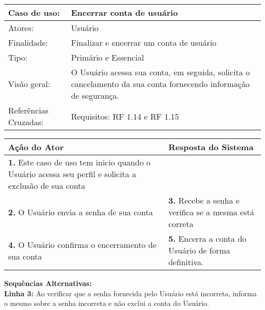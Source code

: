 \documentclass[12pt,a4paper,onecolumn,titlepage]{article}
\begin{document}
\begin{table}[h!]
\begin{center}
\begin{tabular}{p{2.5cm} p{9.5cm}}
Caso de uso: & \textbf{Encerrar conta de usuário} \\ \hline
Atores: & Usuário \\ \hline
Finalidade: & Finalizar e encerrar um conta de usuário\\ \hline
Tipo: & Primário e Essencial \\ \hline
Visão geral: & O Usuário acessa sua conta, em seguida, solicita o cancelamento da sua conta fornecendo informação de segurança. \\ \hline
Referências Cruzadas: & Requisitos: RF 1.14 e RF 1.15\\

\end{tabular}
\end{center}
\end{table} 

\begin{center}
\def\arraystretch{1.1}
\begin{tabular}{|p{6cm}|p{6cm}|}

\hline
\textbf{Ação do Ator} & \textbf{Resposta do Sistema} \\ \hline
\textbf{1.} Este caso de uso tem inicio quando o Usuário acessa seu perfil e solicita a exclusão de sua conta  & \\ \hline
\textbf{2.} O Usuário envia a senha de sua conta  & \textbf{3.} Recebe a senha e verifica se a mesma está correta  \\ \hline
\textbf{4.} O Usuário confirma o encerramento de sua conta  & \textbf{5.} Encerra a conta do Usuário de forma definitiva. \\ \hline
\end{tabular}
\end{center}

\textbf{Sequências Alternativas:} \\
\textbf{Linha 3:} Ao verificar que a senha fornecida pelo Usuário está incorreta, informa o mesmo sobre a senha incorreta e não exclui a conta do Usuário.

\newpage
\end{document}
